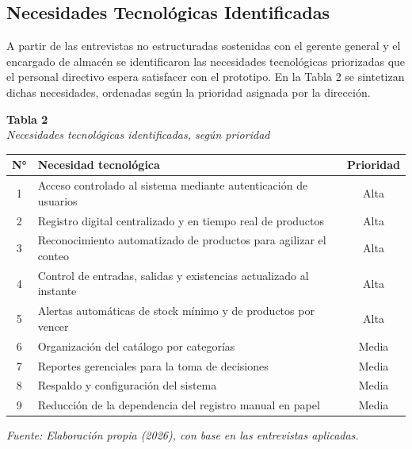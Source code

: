 \documentclass[12pt, letterpaper]{report}
\begin{document}
\subsection{Necesidades Tecnológicas Identificadas}

A partir de las entrevistas no estructuradas sostenidas con el gerente
general y el encargado de almacén se identificaron las necesidades
tecnológicas priorizadas que el personal directivo espera satisfacer
con el prototipo. En la Tabla 2 se sintetizan dichas necesidades,
ordenadas según la prioridad asignada por la dirección.

\vspace{6pt}
%
\noindent\textbf{Tabla 2}\\
\textit{Necesidades tecnológicas identificadas, según prioridad}
\vspace{4pt}

\begin{center}
\begin{tabular}{|c|>{\raggedright\arraybackslash}p{8.0cm}|c|}
\hline
\textbf{N°} & \textbf{Necesidad tecnológica} & \textbf{Prioridad} \\
\hline
1 & Acceso controlado al sistema mediante autenticación de usuarios &
Alta \\
\hline
2 & Registro digital centralizado y en tiempo real de productos & Alta \\
\hline
3 & Reconocimiento automatizado de productos para agilizar el conteo &
Alta \\
\hline
4 & Control de entradas, salidas y existencias actualizado al
instante & Alta \\
\hline
5 & Alertas automáticas de stock mínimo y de productos por vencer &
Alta \\
\hline
6 & Organización del catálogo por categorías & Media \\
\hline
7 & Reportes gerenciales para la toma de decisiones & Media \\
\hline
8 & Respaldo y configuración del sistema & Media \\
\hline
9 & Reducción de la dependencia del registro manual en papel & Media \\
\hline
\end{tabular}
\end{center}
\vspace{2pt}
\noindent\small\textit{Fuente: Elaboración propia (2026), con base en
las entrevistas aplicadas.}\normalsize
{}
\end{document}
